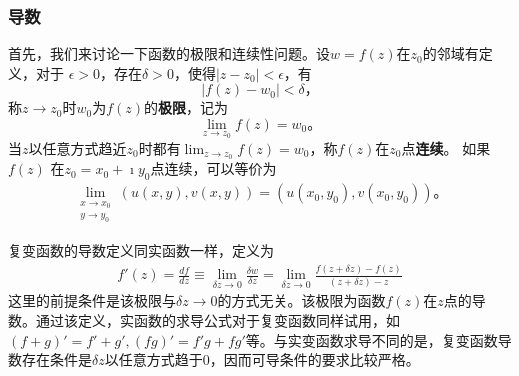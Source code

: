 \subsubsection{导数}

首先，我们来讨论一下函数的极限和连续性问题。设$w=f(z)$在$z_0$的邻域有定义，对于
$\epsilon > 0$，存在$\delta > 0$，使得$|z-z_0| < \epsilon$，有
\begin{equation}
    |f(z) - w_0| < \delta \textrm{，}
\end{equation}
称$z\to z_0$时$w_0$为$f(z)$的{\bf 极限}，记为
\begin{equation}
    \lim_{z\to z_0} f(z) = w_0 \textrm{。}
\end{equation}
当$z$以任意方式趋近$z_0$时都有$ \lim_{z\to z_0} f(z) = w_0$，称$f(z)$在$z_0$点{\bf 连续}。
如果$f(z)$ 在$z_0=x_0 + \imath y_0$点连续，可以等价为
\begin{align}
    \lim_{\substack{x\to x_0\\y\to y_0}} \left(u(x,y), v(x,y)\right) = \left(u(x_0, y_0), v(x_0, y_0)\right) \textrm{。} 
\end{align}

复变函数的导数定义同实函数一样，定义为
\begin{align}
    \label{eq:derivative_def}
    f'(z) = \frac{df}{dz} 
    \equiv\lim_{\delta z \to 0} \frac{\delta w} {\delta z} 
    = \lim_{\delta z\to 0} \frac{f(z+\delta z) - f(z) } {(z+\delta z ) - z}
\end{align}
这里的前提条件是该极限与$\delta z \to 0$的方式无关。该极限为函数$f(z)$在$z$点的导数。通过该定义，实函数的求导公式对于复变函数同样试用，如
$(f+g)' = f' + g', (fg)' =f'g + fg'$等。与实变函数求导不同的是，复变函数导数存在条件是$\delta z$以任意方式趋于$0$，因而可导条件的要求比较严格。


